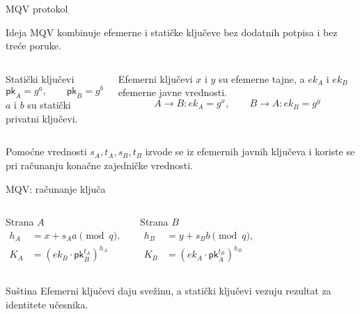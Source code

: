 \documentclass[aspectratio=1610]{beamer}
\newcommand{\pk}{\mathsf{pk}}
\begin{document}
\begin{frame}[t]{MQV protokol}
\small
\begin{block}{Ideja}
MQV kombinuje efemerne i statičke ključeve bez dodatnih potpisa i bez treće poruke.
\end{block}

\begin{columns}[T,onlytextwidth]
\begin{block}{Statički ključevi}
\[
\pk_A=g^a,\qquad \pk_B=g^b
\]
$a$ i $b$ su statički privatni ključevi.
\end{block}

\begin{block}{Efemerni ključevi}
$x$ i $y$ su efemerne tajne, a $ek_A$ i $ek_B$ efemerne javne vrednosti.
\[
A\rightarrow B: ek_A=g^x,\qquad B\rightarrow A: ek_B=g^y
\]
\end{block}
\end{columns}

\begin{alertblock}{Pomoćne vrednosti}
$s_A,t_A,s_B,t_B$ izvode se iz efemernih javnih ključeva i koriste se pri računanju konačne zajedničke vrednosti.
\end{alertblock}
\end{frame}

\begin{frame}[t]{MQV: računanje ključa}
\small
\begin{columns}[T,onlytextwidth]
\begin{block}{Strana $A$}
\[
\begin{aligned}
h_A &= x+s_Aa \pmod q,\\
K_A &= (ek_B\cdot \pk_B^{t_A})^{h_A}
\end{aligned}
\]
\end{block}

\begin{block}{Strana $B$}
\[
\begin{aligned}
h_B &= y+s_Bb \pmod q,\\
K_B &= (ek_A\cdot \pk_A^{t_B})^{h_B}
\end{aligned}
\]
\end{block}
\end{columns}

\vspace{0.3em}
\begin{alertblock}{Suština}
Efemerni ključevi daju svežinu, a statički ključevi vezuju rezultat za identitete učesnika.
\end{alertblock}
\end{frame}
\end{document}
